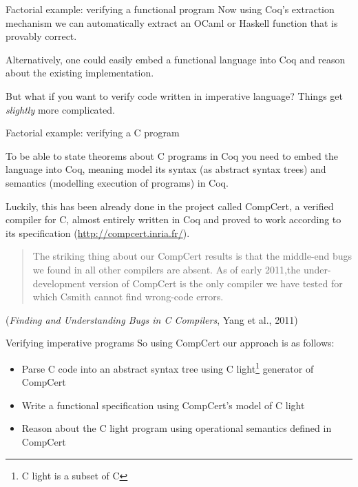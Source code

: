 \documentclass[10pt]{beamer}
\begin{document}
\begin{frame}{Factorial example: verifying a functional program}
  Now using Coq's extraction mechanism we can automatically extract an OCaml or Haskell function that is provably correct.

  Alternatively, one could easily embed a functional language into Coq and reason about the existing implementation.

  But what if you want to verify code written in imperative language? Things get \emph{slightly} more complicated.
\end{frame}


\begin{frame}{Factorial example: verifying a C program}

    To be able to state theorems about C programs in Coq you need to embed the language into Coq, meaning model its syntax (as abstract syntax trees) and semantics (modelling execution of programs) in Coq.

    Luckily, this has been already done in the project called CompCert, a verified compiler for C, almost entirely written in Coq and proved to work according to its specification (\url{http://compcert.inria.fr/}).

    \begin{quote}
      The striking thing about our CompCert results is that the middle-end bugs we found in all other compilers are absent. As of early 2011,the under-development version of CompCert is the only compiler we have tested for which Csmith cannot find wrong-code errors.
    \end{quote} ({\it Finding and Understanding Bugs in C Compilers}, Yang et al., 2011)

\end{frame}
    
\begin{frame}{Verifying imperative programs}
    So using CompCert our approach is as follows:
  \begin{itemize}
  \item Parse C code into an abstract syntax tree using C light\footnote{C light is a subset of C} generator of CompCert
  \item Write a functional specification using CompCert's model of C light 
  \item Reason about the C light program using operational semantics defined in CompCert
\end{itemize}
\end{frame}
\end{document}
